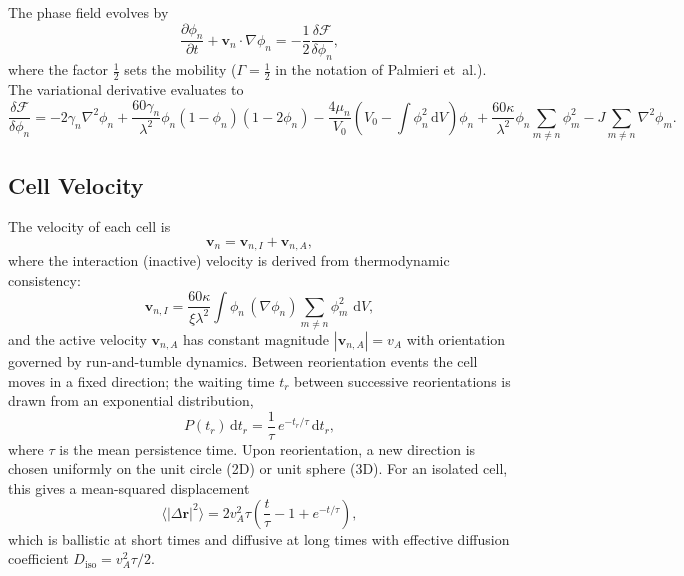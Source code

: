 \documentclass[11pt]{article}
\newcommand{\vA}{v_{\!A}}
\newcommand{\vnI}{\mathbf{v}_{n,I}}
\newcommand{\vnA}{\mathbf{v}_{n,A}}
\newcommand{\Diso}{D_{\mathrm{iso}}}
\newcommand{\taut}{\tau}
\newcommand{\phin}{\phi_n}
\newcommand{\dV}{\,\mathrm{d}V}
\begin{document}
The phase field evolves by
\begin{equation}
\label{eq:eom}
\frac{\partial\phin}{\partial t} + \mathbf{v}_n \cdot \nabla\phin = -\frac{1}{2}\frac{\delta\mathcal{F}}{\delta\phin},
\end{equation}
where the factor $\frac{1}{2}$ sets the mobility ($\Gamma = \frac{1}{2}$ in the notation of Palmieri et~al.).  The variational derivative evaluates to
\begin{equation}
\label{eq:varderiv}
\frac{\delta\mathcal{F}}{\delta\phin} = -2\gamma_n\nabla^2\phin + \frac{60\gamma_n}{\lambda^2}\phin(1-\phin)(1-2\phin) - \frac{4\mu_n}{V_0}\!\left(V_0-\!\int\!\phin^2\dV\right)\phin + \frac{60\kappa}{\lambda^2}\phin\!\sum_{m\neq n}\phi_m^2 - J\!\sum_{m\neq n}\nabla^2\phi_m.
\end{equation}

\subsection{Cell Velocity}

The velocity of each cell is
\begin{equation}
\mathbf{v}_n = \vnI + \vnA,
\end{equation}
where the interaction (inactive) velocity is derived from thermodynamic consistency:
\begin{equation}
\label{eq:vI}
\vnI = \frac{60\kappa}{\xi\lambda^2}\int \phin\,(\nabla\phin)\sum_{m\neq n}\phi_m^2\,\dV,
\end{equation}
and the active velocity $\vnA$ has constant magnitude $|\vnA|=\vA$ with orientation governed by run-and-tumble dynamics.  Between reorientation events the cell moves in a fixed direction; the waiting time $t_r$ between successive reorientations is drawn from an exponential distribution,
\begin{equation}
\label{eq:tumble}
P(t_r)\,\mathrm{d}t_r = \frac{1}{\taut}\,e^{-t_r/\taut}\,\mathrm{d}t_r,
\end{equation}
where $\taut$ is the mean persistence time.  Upon reorientation, a new direction is chosen uniformly on the unit circle (2D) or unit sphere (3D).  For an isolated cell, this gives a mean-squared displacement
\begin{equation}
\label{eq:msd_iso}
\langle|\Delta\mathbf{r}|^2\rangle = 2\vA^2\taut\!\left(\frac{t}{\taut} - 1 + e^{-t/\taut}\right),
\end{equation}
which is ballistic at short times and diffusive at long times with effective diffusion coefficient $\Diso = \vA^2\taut/2$.
\end{document}

